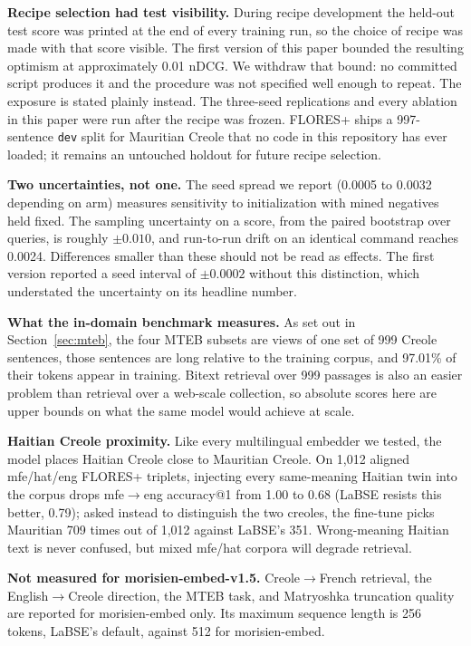 \documentclass[11pt]{article}
\begin{document}
\textbf{Recipe selection had test visibility.} During recipe development the held-out test score was
printed at the end of every training run, so the choice of recipe was made with that score visible.
The first version of this paper bounded the resulting optimism at approximately 0.01 nDCG. We
withdraw that bound: no committed script produces it and the procedure was not specified well enough
to repeat. The exposure is stated plainly instead. The three-seed replications and every ablation in
this paper were run after the recipe was frozen. FLORES+ ships a 997-sentence \texttt{dev} split for
Mauritian Creole that no code in this repository has ever loaded; it remains an untouched holdout for
future recipe selection.

\textbf{Two uncertainties, not one.} The seed spread we report (0.0005 to 0.0032 depending on arm)
measures sensitivity to initialization with mined negatives held fixed. The sampling uncertainty on a
score, from the paired bootstrap over queries, is roughly $\pm 0.010$, and run-to-run drift on an
identical command reaches 0.0024. Differences smaller than these should not be read as effects. The
first version reported a seed interval of $\pm 0.0002$ without this distinction, which understated
the uncertainty on its headline number.

\textbf{What the in-domain benchmark measures.} As set out in Section~\ref{sec:mteb}, the four MTEB
subsets are views of one set of 999 Creole sentences, those sentences are long relative to the
training corpus, and 97.01\% of their tokens appear in training. Bitext retrieval over 999 passages
is also an easier problem than retrieval over a web-scale collection, so absolute scores here are
upper bounds on what the same model would achieve at scale.

\textbf{Haitian Creole proximity.} Like every multilingual embedder we tested, the model places
Haitian Creole close to Mauritian Creole. On 1{,}012 aligned mfe/hat/eng FLORES+ triplets, injecting
every same-meaning Haitian twin into the corpus drops mfe$\rightarrow$eng accuracy@1 from 1.00 to
0.68 (LaBSE resists this better, 0.79); asked instead to distinguish the two creoles, the fine-tune
picks Mauritian 709 times out of 1{,}012 against LaBSE's 351. Wrong-meaning Haitian text is never
confused, but mixed mfe/hat corpora will degrade retrieval.

\textbf{Not measured for morisien-embed-v1.5.} Creole$\rightarrow$French retrieval, the
English$\rightarrow$Creole direction, the MTEB task, and Matryoshka truncation quality are reported
for morisien-embed only. Its maximum sequence length is 256 tokens, LaBSE's default, against 512 for
morisien-embed.
\end{document}
